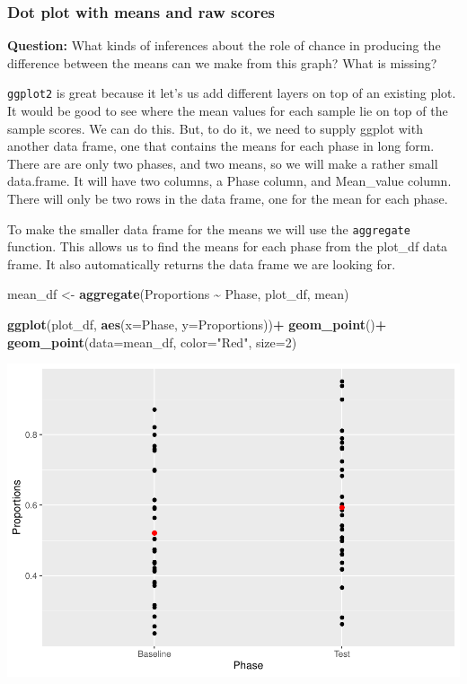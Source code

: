 \documentclass[
]{book}
\newenvironment{Shaded}{\begin{snugshade}}{\end{snugshade}}
\newcommand{\AttributeTok}[1]{\textcolor[rgb]{0.13,0.29,0.53}{#1}}
\newcommand{\DecValTok}[1]{\textcolor[rgb]{0.00,0.00,0.81}{#1}}
\newcommand{\FunctionTok}[1]{\textcolor[rgb]{0.13,0.29,0.53}{\textbf{#1}}}
\newcommand{\NormalTok}[1]{#1}
\newcommand{\OtherTok}[1]{\textcolor[rgb]{0.56,0.35,0.01}{#1}}
\newcommand{\SpecialCharTok}[1]{\textcolor[rgb]{0.81,0.36,0.00}{\textbf{#1}}}
\newcommand{\StringTok}[1]{\textcolor[rgb]{0.31,0.60,0.02}{#1}}
\begin{document}
\hypertarget{dot-plot-with-means-and-raw-scores}{%
\subsubsection{Dot plot with means and raw scores}\label{dot-plot-with-means-and-raw-scores}}

\textbf{Question:} What kinds of inferences about the role of chance in producing the difference between the means can we make from this graph? What is missing?

\texttt{ggplot2} is great because it let's us add different layers on top of an existing plot. It would be good to see where the mean values for each sample lie on top of the sample scores. We can do this. But, to do it, we need to supply ggplot with another data frame, one that contains the means for each phase in long form. There are are only two phases, and two means, so we will make a rather small data.frame. It will have two columns, a Phase column, and Mean\_value column. There will only be two rows in the data frame, one for the mean for each phase.

To make the smaller data frame for the means we will use the \texttt{aggregate} function. This allows us to find the means for each phase from the plot\_df data frame. It also automatically returns the data frame we are looking for.

\begin{Shaded}
\begin{Highlighting}[]
\NormalTok{mean\_df }\OtherTok{\textless{}{-}} \FunctionTok{aggregate}\NormalTok{(Proportions }\SpecialCharTok{\textasciitilde{}}\NormalTok{ Phase, plot\_df, mean)}

\FunctionTok{ggplot}\NormalTok{(plot\_df, }\FunctionTok{aes}\NormalTok{(}\AttributeTok{x=}\NormalTok{Phase, }\AttributeTok{y=}\NormalTok{Proportions))}\SpecialCharTok{+} 
  \FunctionTok{geom\_point}\NormalTok{()}\SpecialCharTok{+}
  \FunctionTok{geom\_point}\NormalTok{(}\AttributeTok{data=}\NormalTok{mean\_df, }\AttributeTok{color=}\StringTok{"Red"}\NormalTok{, }\AttributeTok{size=}\DecValTok{2}\NormalTok{)}
\end{Highlighting}
\end{Shaded}

\includegraphics{Statistics_Lab_files/figure-latex/unnamed-chunk-176-1.pdf}
\end{document}

